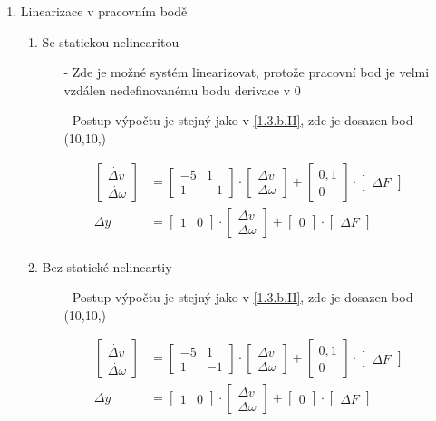 \documentclass{article}
\newcommand\mat[1]{\begin{bmatrix}#1\end{bmatrix}}
\begin{document}
\begin{enumerate}
\begin{enumerate}
        \item Linearizace v pracovním bodě
            \begin{enumerate}
                \item Se statickou nelinearitou
                    \begin{itemize}
                        \item[-] Zde je možné systém linearizovat, protože pracovní bod je velmi vzdálen nedefinovanému bodu derivace v 0
                        \item[-] Postup výpočtu je stejný jako v \underline{\ref{1.3.b.II}}, zde je dosazen bod (10,10,)
                    \end{itemize}
                
                    
                    \begin{align*}
                        \mat{\dot{\Delta v}\\ \dot{\Delta \omega}} &= \mat{-5 & 1\\ 1 & -1} \cdot \mat{\Delta v\\ \Delta \omega} + \mat{0,1\\ 0} \cdot \mat{\Delta F}\\
                        \Delta y &= \mat{1 & 0} \cdot \mat{\Delta v\\ \Delta \omega} + \mat{0} \cdot \mat{\Delta F}\\
                    \end{align*}

                \newpage
                
                \item Bez statické nelineartiy
                    \begin{itemize}
                        \item[-] Postup výpočtu je stejný jako v \underline{\ref{1.3.b.II}}, zde je dosazen bod (10,10,)
                    \end{itemize}
                
                    \begin{align*}
                        \mat{\dot{\Delta v}\\ \dot{\Delta \omega}} &= \mat{-5 & 1\\ 1 & -1} \cdot \mat{\Delta v\\ \Delta \omega} + \mat{0,1\\ 0} \cdot \mat{\Delta F}\\
                        \Delta y &= \mat{1 & 0} \cdot \mat{\Delta v\\ \Delta \omega} + \mat{0} \cdot \mat{\Delta F}\\
                    \end{align*}
                    

\end{enumerate}
\end{enumerate}
\end{enumerate}
\end{document}
